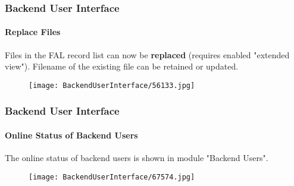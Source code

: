 \begin{frame}[fragile]
	\frametitle{Backend User Interface}
	\framesubtitle{Replace Files}

	Files in the FAL record list can now be \textbf{replaced} (requires enabled "extended view").
	Filename of the existing file can be retained or updated.

	\begin{figure}
		\texttt{[image: BackendUserInterface/56133.jpg]}
	\end{figure}

\end{frame}

\begin{frame}[fragile]
	\frametitle{Backend User Interface}
	\framesubtitle{Online Status of Backend Users}

	The online status of backend users is shown in module "Backend Users".

	\begin{figure}
		\texttt{[image: BackendUserInterface/67574.jpg]}
	\end{figure}

\end{frame}

